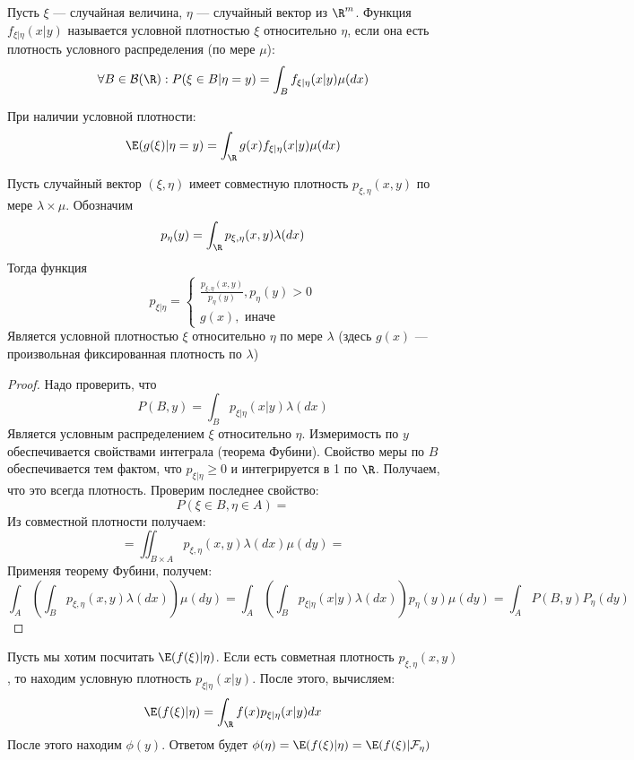 \begin{definition}
    Пусть \(\xi\) --- случайная величина, \(\eta\) --- случайный вектор из \(\R^m\). Функция \(f_{\xi|\eta}(x|y)\) называется условной плотностью \(\xi\) относительно \(\eta\), если она есть плотность условного распределения (по мере \(\mu\)):
    \[\forall B \in \mathcal{B}(\R): P(\xi \in B|\eta = y) = \int_B f_{\xi|\eta}(x|y)\mu(dx)\]
\end{definition}

\begin{corollary}
    При наличии условной плотности:
    \[\E(g(\xi)|\eta = y) = \int_\R g(x) f_{\xi|\eta}(x|y)\mu(dx)\]
\end{corollary}


\begin{theorem}
    Пусть случайный вектор \((\xi, \eta)\) имеет совместную плотность \(p_{\xi, \eta}(x, y)\) по мере \(\lambda \times \mu\). Обозначим
    \[p_{\eta}(y) = \int_\R p_{\xi, \eta}(x, y) \lambda(dx)\]
    Тогда функция 
    \[p_{\xi|\eta} = \left\{\begin{array}{l}
        \frac{p_{\xi, \eta}(x, y)}{p_\eta(y)}, p_\eta(y) > 0 \\
        g(x), \text{ иначе}
    \end{array}\right.\]
    Является условной плотностью \(\xi\) относительно \(\eta\) по мере \(\lambda\) (здесь \(g(x)\) --- произвольная фиксированная плотность по \(\lambda\))
\end{theorem}
\begin{proof}
    Надо проверить, что 
    \[P(B, y) = \int_B p_{\xi|\eta}(x|y)\lambda(dx)\]
    Является условным распределением \(\xi\) относительно \(\eta\). Измеримость по \(y\) обеспечивается свойствами интеграла (теорема Фубини). Свойство меры по \(B\) обеспечивается тем фактом, что \(p_{\xi|\eta} \ge 0\) и интегрируется в 1 по \(\R\). Получаем, что это всегда плотность. Проверим последнее свойство:
    \[P(\xi \in B, \eta \in A) =\]
    Из совместной плотности получаем:
    \[ = \iint_{B \times A} p_{\xi, \eta}(x, y)\lambda(dx)\mu(dy) = \]
    Применяя теорему Фубини, получем:
    \[\int_A\left( \int_B p_{\xi, \eta}(x, y) \lambda(dx) \right) \mu(dy) = \int_A\left( \int_B p_{\xi|\eta}(x|y) \lambda(dx) \right) p_{\eta}(y)\mu(dy) = \int_A P(B, y)P_{\eta}(dy)\]
\end{proof}

\begin{note}
    Пусть мы хотим посчитать \(\E(f(\xi)|\eta)\). Если есть совметная плотность \(p_{\xi, \eta}(x, y)\), то находим условную плотность \(p_{\xi|\eta}(x|y)\). После этого, вычисляем:
    \[\E(f(\xi)|\eta) = \int_\R f(x) p_{\xi|\eta}(x|y)dx\]
    После этого находим \(\phi(y)\). Ответом будет \(\phi(\eta) = \E(f(\xi)|\eta) = \E(f(\xi)|\mathcal{F}_\eta)\)
\end{note}


